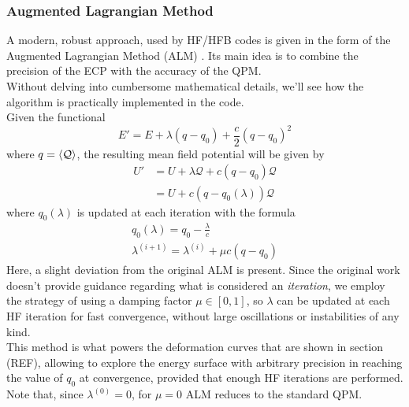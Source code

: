 \subsubsection{Augmented Lagrangian Method}
A modern, robust approach, used by HF/HFB codes \cite{RYSSENS2015175,CHEN2022108344} is given in the form of the Augmented Lagrangian Method (ALM) \cite{Staszczak2010}.
Its main idea is to combine the precision of the ECP with the accuracy of the QPM.
\\Without delving into cumbersome mathematical details, we'll see how the algorithm is practically implemented in the code.
\\Given the functional
\begin{equation}
    \label{eq:alm_lagrangian}
    E' = E + \lambda (q-q_0) + \frac c 2 (q-q_0)^2
\end{equation}
where $q = \expval{{\mathcal Q}}$, the resulting mean field potential will be given by
\begin{align}
    U' &= U + \lambda  {\mathcal Q} + c(q-q_0) {\mathcal Q} 
    \\ &= U + c(q-q_0(\lambda)) {\mathcal Q}
\end{align}
where $q_0(\lambda)$ is updated at each iteration with the formula
\begin{align}
    \label{eq:alm_q0}
    q_0(\lambda) = q_0 - \frac{\lambda}{c}
    \\\lambda ^{(i+1)} = \lambda^{(i)}+\mu c(q-q_0)
\end{align}
Here, a slight deviation from the original ALM is present. Since the original work \cite{Staszczak2010} doesn't provide guidance regarding what is considered an \textit{iteration}, we employ the strategy \cite{CHEN2022108344} of using a damping factor $\mu\in [0, 1]$, so $\lambda$ can be updated at each HF iteration for fast convergence, without large oscillations or instabilities of any kind.
\\This method is what powers the deformation curves that are shown in section (REF), allowing to explore the energy surface with arbitrary precision in reaching the value of $q_0$ at convergence, provided that enough HF iterations are performed.
\\Note that, since $\lambda^{(0)}=0$, for $\mu=0$ ALM reduces to the standard QPM.


